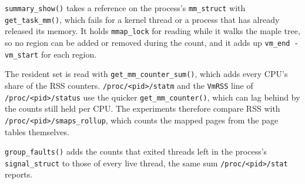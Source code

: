 \texttt{summary\_show()} takes a reference on the process's
\texttt{mm\_struct} with \texttt{get\_task\_mm()}, which fails for a kernel
thread or a process that has already released its memory. It holds
\texttt{mmap\_lock} for reading while it walks the maple tree, so no region
can be added or removed during the count, and it adds up
\texttt{vm\_end - vm\_start} for each region.

The resident set is read with \texttt{get\_mm\_counter\_sum()}, which adds
every CPU's share of the RSS counters. \texttt{/proc/<pid>/statm} and the
\texttt{VmRSS} line of \texttt{/proc/<pid>/status} use the quicker
\texttt{get\_mm\_counter()}, which can lag behind by the counts still held per
CPU. The experiments therefore compare RSS with \texttt{/proc/<pid>/smaps\_rollup},
which counts the mapped pages from the page tables themselves.

\texttt{group\_faults()} adds the counts that exited threads left in the
process's \texttt{signal\_struct} to those of every live thread, the same
sum \texttt{/proc/<pid>/stat} reports.
